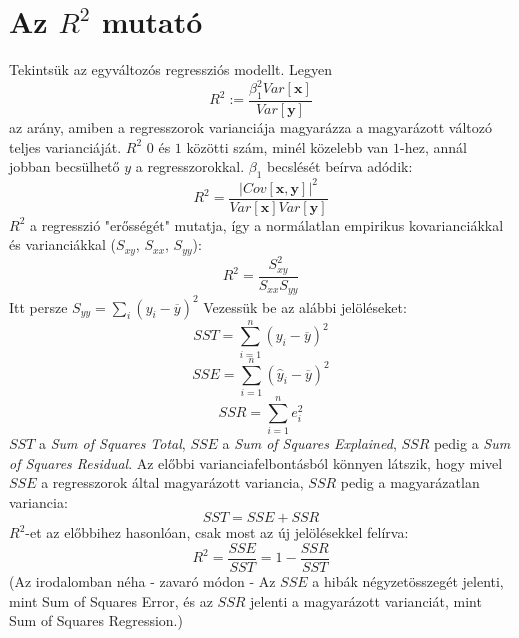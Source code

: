 \documentclass[14p]{report}
\def\pmb{\boldsymbol}
\def\bar{\overline}
\begin{document}
	\section{Az $R^2$ mutató}
	Tekintsük az egyváltozós regressziós modellt. Legyen
	\[
	R^2 := \frac{\beta_1^2Var[\pmb{x}]}{Var[\pmb{y}]}
	\]
	az arány, amiben a regresszorok varianciája magyarázza a magyarázott változó teljes varianciáját. $R^2$ $0$ és $1$ közötti szám, minél közelebb van $1$-hez, annál jobban becsülhető $y$ a regresszorokkal. $\beta_1$ becslését beírva adódik:
	\[
	R^2 = \frac{|Cov[\pmb{x},\pmb{y}]|^2}{Var[\pmb{x}]Var[\pmb{y}]}
	\]
	$R^2$ a regresszió "erősségét" mutatja, így a normálatlan empirikus kovarianciákkal és varianciákkal ($S_{xy}$, $S_{xx}$, $S_{yy}$):
	\[
	R^2 = \frac{S^2_{xy}}{S_{xx}S_{yy}}
	\]
	Itt persze $S_{yy} = \sum_i{(y_i - \bar{y})^2}$
	Vezessük be az alábbi jelöléseket:
	\[
	SST = \sum_{i=1}^{n}{(y_i - \bar{y})^2}
	\]
	\[
	SSE = \sum_{i=1}^{n}{(\hat{y}_i - \bar{y})^2}
	\]
	\[
	SSR = \sum_{i=1}^{n}{e_i^2}
	\]
	$SST$ a \emph{Sum of Squares Total}, $SSE$ a \emph{Sum of Squares Explained}, $SSR$ pedig a \emph{Sum of Squares Residual}. Az előbbi varianciafelbontásból könnyen látszik, hogy mivel $SSE$ a regresszorok által magyarázott variancia, $SSR$ pedig a magyarázatlan variancia:
	\[
	SST = SSE + SSR
	\]
	$R^2$-et az előbbihez hasonlóan, csak most az új jelölésekkel felírva:
	\[
	R^2 = \frac{SSE}{SST} = 1- \frac{SSR}{SST}
	\]
	(Az irodalomban néha - zavaró módon - Az $SSE$ a hibák négyzetösszegét jelenti, mint Sum of Squares Error, és az $SSR$ jelenti a magyarázott varianciát, mint Sum of Squares Regression.)
\end{document}
